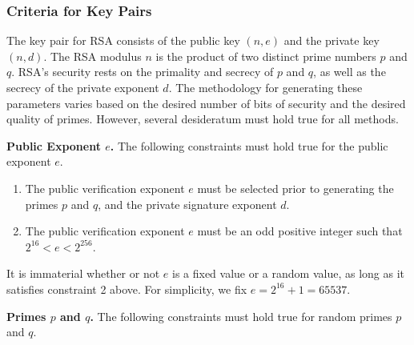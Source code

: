 \documentclass[a4paper]{article}
\begin{document}
\subsubsection{Criteria for Key Pairs}\label{sec:keygen}

The key pair for RSA consists of the public key $(n, e)$ and the private key $(n, d)$. The RSA modulus $n$ is the product of two distinct prime numbers $p$ and $q$. RSA's security rests on the primality and secrecy of $p$ and $q$, as well as the secrecy of the private exponent $d$. The methodology for generating these parameters varies based on the desired number of bits of security and the desired quality of primes. However, several desideratum must hold true for all
methods.\newline

\noindent \textbf{Public Exponent $e$.} The following constraints must hold true for the public exponent $e$.
\begin{enumerate}
    \item The public verification exponent $e$ must be selected prior to generating the primes $p$ and $q$, and the private signature exponent $d$.

    \item The public verification exponent $e$ must be an odd positive integer such that $2^{16} < e < 2^{256}$.

\end{enumerate}

It is immaterial whether or not $e$ is a fixed value or a random value, as long as it satisfies constraint 2 above. For simplicity, we fix $e = 2^{16} + 1 = 65537$.\newline

\noindent \textbf{Primes $p$ and $q$.} The following constraints must hold true for random primes $p$ and $q$.
\end{document}
